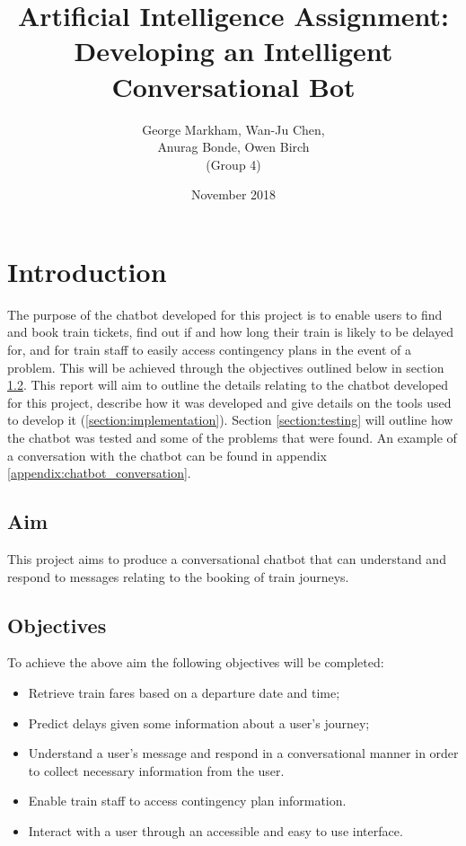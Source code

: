 \documentclass[12pt,a4paper]{article}
\title{Artificial Intelligence Assignment: Developing an Intelligent Conversational Bot}
\author{George Markham, Wan-Ju Chen, \\ Anurag Bonde, Owen Birch \\ (Group 4)} %
\date{November 2018}
\begin{document}
    \maketitle
    \section{Introduction}
    The purpose of the chatbot developed for this project is to enable users to find and book train tickets, find out if and how long their train is likely to be delayed for, and for train staff to easily access contingency plans in the event of a problem.
    This will be achieved through the objectives outlined below in section \ref{subsection:objectives}.
    This report will aim to outline the details relating to the chatbot developed for this project, describe how it was developed and give details on the tools used to develop it (\ref{section:implementation}).
    Section \ref{section:testing} will outline how the chatbot was tested and some of the problems that were found.
    An example of a conversation with the chatbot can be found in appendix \ref{appendix:chatbot_conversation}.
    
    \subsection{Aim}
    \label{subsection:aims}
    This project aims to produce a conversational chatbot that can understand and respond to messages relating to the booking of train journeys.
    
    \subsection{Objectives}
    \label{subsection:objectives}
    To achieve the above aim the following objectives will be completed:
    \begin{itemize}
        \item Retrieve train fares based on a departure date and time;
        \item Predict delays given some information about a user's journey;
        \item Understand a user's message and respond in a conversational manner in order to collect necessary information from the user.
        \item Enable train staff to access contingency plan information.
        \item Interact with a user through an accessible and easy to use interface.
    \end{itemize}
    
\end{document}
